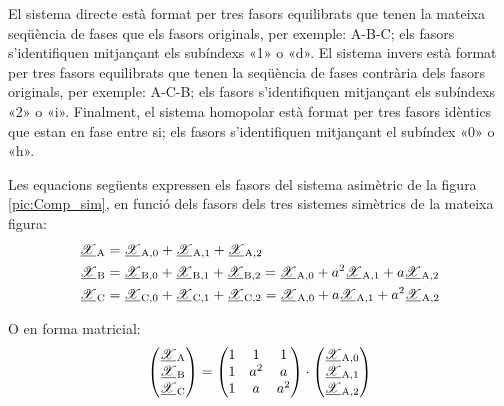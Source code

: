 \begin{center}
    
    \label{pic:Comp_sim}
\end{center}

 
 El sistema directe està format per tres
fasors equilibrats que tenen la mateixa seqüència de fases que els fasors
originals, per exemple: A-B-C; els fasors
s'identifiquen mitjançant els subíndexs «1» o «d». El sistema
invers està format per tres fasors equilibrats que tenen la seqüència de fases contrària
 dels fasors originals, per exemple: A-C-B; els fasors s'identifiquen mitjançant els
subíndexs «2» o «i». Finalment, el sistema homopolar està
format per tres fasors idèntics que estan en fase entre si; els fasors 
s'identifiquen mitjançant el subíndex «0» o «h».

Les equacions següents expressen els fasors del sistema asimètric de la figura \vref{pic:Comp_sim}, en funció
dels fasors dels tres sistemes simètrics de la mateixa figura:
\begin{subequations}
\begin{align}
   \cmplx{\mathscr{X}}\ped{A} &= \cmplx{\mathscr{X}}\ped{A,0}  +
   \cmplx{\mathscr{X}}\ped{A,1} + \cmplx{\mathscr{X}}\ped{A,2} \label{eq:c_sim_a}\\
   \cmplx{\mathscr{X}}\ped{B} &= \cmplx{\mathscr{X}}\ped{B,0} + \cmplx{\mathscr{X}}\ped{B,1} +
   \cmplx{\mathscr{X}}\ped{B,2}  =  \cmplx{\mathscr{X}}\ped{A,0} + a^2
   \cmplx{\mathscr{X}}\ped{A,1} + a \cmplx{\mathscr{X}}\ped{A,2} \label{eq:c_sim_b}\\
   \cmplx{\mathscr{X}}\ped{C} &= \cmplx{\mathscr{X}}\ped{C,0} + \cmplx{\mathscr{X}}\ped{C,1} +
   \cmplx{\mathscr{X}}\ped{C,2}  = \cmplx{\mathscr{X}}\ped{A,0} + a
   \cmplx{\mathscr{X}}\ped{A,1} + a^2 \cmplx{\mathscr{X}}\ped{A,2} \label{eq:c_sim_c}
\end{align}
\end{subequations}

O en forma matricial:
\begin{equation}\label{eq:c_sim_mat}
   \begin{pmatrix}
     \cmplx{\mathscr{X}}\ped{A} \\
     \cmplx{\mathscr{X}}\ped{B} \\
     \cmplx{\mathscr{X}}\ped{C}
   \end{pmatrix} =
   \begin{pmatrix}
     1 & 1 & 1 \\
     1 & a^2 & a\\
     1 & a & a^2
   \end{pmatrix} \cdot
   \begin{pmatrix}
     \cmplx{\mathscr{X}}\ped{A,0} \\
     \cmplx{\mathscr{X}}\ped{A,1} \\
     \cmplx{\mathscr{X}}\ped{A,2}
   \end{pmatrix}
\end{equation}

